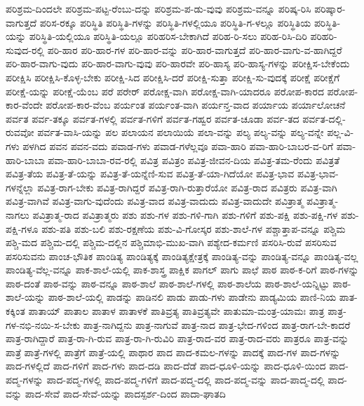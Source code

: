 {ಪರಿಶ್ರಮ-ದಿಂದಲೇ
ಪರಿಶ್ರಮ-ಪಟ್ಟ-ರೆಂಬು-ದನ್ನು
ಪರಿಶ್ರಮ-ಪ-ಡು-ವುವು
ಪರಿಶ್ರಮ-ವನ್ನೂ
ಪರಿಷ್ಕ-ರಿಸಿ
ಪರಿಷ್ಕಾರ-ವಾಗುತ್ತದೆ
ಪರಿಸ-ರಕ್ಕೂ
ಪರಿಸ್ಥಿತಿ
ಪರಿಸ್ಥಿತಿ-ಗಳನ್ನು
ಪರಿಸ್ಥಿತಿ-ಗಳಲ್ಲಿಯೂ
ಪರಿಸ್ಥಿತಿ-ಗ-ಳಲ್ಲೂ
ಪರಿಸ್ಥಿತಿಯ
ಪರಿಸ್ಥಿತಿ-ಯನ್ನು
ಪರಿಸ್ಥಿತಿ-ಯಲ್ಲಿಯೂ
ಪರಿಸ್ಥಿತಿ-ಯಲ್ಲೂ
ಪರಿಹರಿಸ-ಬೇಕಾಗಿದೆ
ಪರಿಹ-ರಿ-ಸಲು
ಪರಿಹ-ರಿಸಿ-ದಿರಿ
ಪರಿಹರಿ-ಸುವುದ-ರಲ್ಲಿ
ಪರಿ-ಹಾರ
ಪರಿ-ಹಾರ-ಗಳ
ಪರಿ-ಹಾರ-ವನ್ನು
ಪರಿ-ಹಾರ-ವಾಗುತ್ತದೆ
ಪರಿ-ಹಾರ-ವಾಗು-ವ-ಹಾಗಿದ್ದರೆ
ಪರಿ-ಹಾರ-ವಾಗು-ವುದು
ಪರಿ-ಹಾರ-ವಾಗು-ವುವು
ಪರಿ-ಹಾರವೇ
ಪರಿ-ಹಾಸ್ಯ
ಪರಿ-ಹಾಸ್ಯ-ಗಳನ್ನು
ಪರೀಕ್ಷಿಸ-ಬೇಕೆಂದು
ಪರೀಕ್ಷಿಸಿ
ಪರೀಕ್ಷಿಸಿ-ಕೊಳ್ಳ-ಬೇಕು
ಪರೀಕ್ಷಿ-ಸಿದ
ಪರೀಕ್ಷಿಸಿ-ದರೆ
ಪರೀಕ್ಷಿ-ಸುತ್ತಾ
ಪರೀಕ್ಷಿ-ಸು-ವುದಕ್ಕೆ
ಪರೀಕ್ಷೆ
ಪರೀಕ್ಷೆಗೆ
ಪರೀಕ್ಷೆ-ಯನ್ನು
ಪರೀಕ್ಷೆ-ಯೆಂಬ
ಪರೆ
ಪರೇರ್
ಪರೋಕ್ಷ-ವಾಗಿ
ಪರೋಕ್ಷ-ವಾಗಿ-ಯಾದರೂ
ಪರೋಪ-ಕಾರದ
ಪರೋಪ-ಕಾರ-ವೆಂದೇ
ಪರೋಪ-ಕಾರ-ವೆಂಬ
ಪರ್ಯಂತ
ಪರ್ಯಂತ-ವಾಗಿ
ಪರ್ಯನ್ತ-ವಾದ
ಪರ್ಯಾಯ
ಪರ್ಯಾಲೋಚನೆ
ಪರ್ವತ
ಪರ್ವ-ತಕ್ಕೂ
ಪರ್ವತ-ಗಳಲ್ಲಿ
ಪರ್ವತ-ಗಳಿಗೆ
ಪರ್ವತ-ಗಹ್ವರ
ಪರ್ವತ-ಚೂಡಾ
ಪರ್ವ-ತದ
ಪರ್ವತ-ದಲ್ಲಿ-ರುವವೋ
ಪರ್ವತ-ವಾಸಿ-ಯನ್ನು
ಪಲ
ಪಲಾಯನ
ಪಲಾಯಿಯೆ
ಪಲಾ-ವನ್ನು
ಪಲ್ಯ
ಪಲ್ಯ-ವನ್ನು
ಪಲ್ಯ-ವನ್ನೇ
ಪಲ್ಲ-ವಿ-ಗಳು
ಪಳಗಿದ
ಪವನ
ಪವನ-ವದು
ಪವಾಡ-ಗಳು
ಪವಾಡ-ಗಳೆಲ್ಲವೂ
ಪವಾ-ಹಾರಿ
ಪವಾ-ಹಾರಿ-ಬಾಬರ-ವ-ರಿಗೆ
ಪವಾ-ಹಾರಿ-ಬಾಬಾ
ಪವಾ-ಹಾರಿ-ಬಾಬಾ-ರವ-ರಲ್ಲಿ
ಪವಿತ್ರ
ಪವಿತ್ರಂ
ಪವಿತ್ರ-ಜೀವನ-ದಿಯ
ಪವಿತ್ರ-ತಮ-ರೆಂದು
ಪವಿತ್ರತೆ
ಪವಿತ್ರ-ತೆಯ
ಪವಿತ್ರ-ತೆ-ಯನ್ನು
ಪವಿತ್ರ-ತೆ-ಯನ್ನೆಣಿ-ಸುವ
ಪವಿತ್ರ-ತೆ-ಯಾ-ಗಿದೆಯೋ
ಪವಿತ್ರ-ಭಾವ
ಪವಿತ್ರ-ಭಾವ-ಗಳನ್ನೆಲ್ಲಾ
ಪವಿತ್ರ-ರಾಗ-ಬೇಕು
ಪವಿತ್ರ-ರಾಗಿದ್ದರೆ
ಪವಿತ್ರ-ರಾಗಿ-ರುತ್ತಾರೆಯೋ
ಪವಿತ್ರ-ರಾದ
ಪವಿತ್ರರು
ಪವಿತ್ರ-ವಾಗಿ
ಪವಿತ್ರ-ವಾಗಿವೆ
ಪವಿತ್ರ-ವಾಗು-ವುದೆಂದು
ಪವಿತ್ರ-ವಾದ
ಪವಿತ್ರ-ವಾದುದು
ಪವಿತ್ರ-ವಾದುದೇ
ಪವಿತ್ರಾತ್ಮ
ಪವಿತ್ರಾತ್ಮ-ನಾಗಲು
ಪವಿತ್ರಾತ್ಮ-ರಾದ
ಪವಿತ್ರಾತ್ಮರು
ಪಶು
ಪಶು-ಗಳ
ಪಶು-ಗಳಿ-ಗಾಗಿ
ಪಶು-ಗಳಿಗೆ
ಪಶು-ಪಕ್ಷಿ
ಪಶು-ಪಕ್ಷಿ-ಗಳ
ಪಶು-ಪಕ್ಷಿ-ಗಳೂ
ಪಶು-ಪತಿ
ಪಶು-ಬಲಿ
ಪಶು-ರಕ್ಷಣೆಯ
ಪಶು-ವಿ-ಗೋಸ್ಕರ
ಪಶು-ಶಾಲೆ-ಗಳ
ಪಶ್ಚಾತ್ತಾಪ-ವನ್ನೂ
ಪಶ್ಚಿಮ
ಪಶ್ಚಿ-ಮದ
ಪಶ್ಚಿಮ-ದಲ್ಲಿ
ಪಶ್ಚಿಮ-ದಲ್ಲಿನ
ಪಶ್ಚಿಮಾಭಿ-ಮುಖ-ವಾಗಿ
ಪಶ್ಯೇದ-ಕರ್ಮಣಿ
ಪಸರಿಸಿ-ರುವೆ
ಪಸರಿಸುವ
ಪಸರಿಸುವನು
ಪಾಂಚ-ಭೌತಿಕ
ಪಾಂಡಿತ್ಯ
ಪಾಂಡಿತ್ಯಕ್ಕೆ
ಪಾಂಡಿತ್ಯಕ್ಷೇತ್ರಕ್ಕೆ
ಪಾಂಡಿತ್ಯ-ವನ್ನು
ಪಾಂಡಿತ್ಯ-ವನ್ನೂ
ಪಾಂಡಿತ್ಯ-ವಲ್ಲ
ಪಾಂಡಿತ್ಯ-ವೆಲ್ಲ-ವನ್ನೂ
ಪಾಕ-ಶಾಲೆ-ಯಲ್ಲಿ
ಪಾಕ-ಶಾಸ್ತ್ರ
ಪಾಕ್ಷಿಕ
ಪಾಗಲ್
ಪಾಗು
ಪಾಛೆ
ಪಾಠ
ಪಾಠ-ಕ-ರಿಗೆ
ಪಾಠ-ಗಳನ್ನು
ಪಾಠ-ದಂತೆ
ಪಾಠ-ವನ್ನು
ಪಾಠ-ವನ್ನೂ
ಪಾಠ-ಶಾಲೆ
ಪಾಠ-ಶಾಲೆ-ಗಳಲ್ಲಿ
ಪಾಠ-ಶಾಲೆಯ
ಪಾಠ-ಶಾಲೆ-ಯನ್ನಿಟ್ಟು
ಪಾಠ-ಶಾಲೆ-ಯನ್ನು
ಪಾಠ-ಶಾಲೆ-ಯಲ್ಲಿ
ಪಾಡನ್ನು
ಪಾಡಿನಲಿ
ಪಾಡು
ಪಾಡು-ಗಳು
ಪಾಡೇನು
ಪಾಡ್ಯಮಿಯ
ಪಾಣಿ-ನಿಯ
ಪಾತ-ಕಕ್ಕಿಂತ
ಪಾತಾಯ್
ಪಾತಾಲ
ಪಾತಾಳ
ಪಾತಾಳಕೆ
ಪಾತಿವ್ರತ್ಯ
ಪಾತಿವ್ರತ್ಯವೇ
ಪಾತುಮಾ-ಮಂತ್ರ-ಯಾಮಃ
ಪಾತ್ರ
ಪಾತ್ರ-ಗಳ-ನಭಿ-ನಯಿ-ಸ-ಬೇಕು
ಪಾತ್ರ-ನಾಗಿದ್ದನು
ಪಾತ್ರ-ನಾಗುವೆ
ಪಾತ್ರ-ನಾದ
ಪಾತ್ರ-ಭೇದ-ಗಳಿಂದ
ಪಾತ್ರ-ರಾಗ-ಬೇ-ಕಾದರೆ
ಪಾತ್ರ-ರಾಗಿದ್ದಾರೆ
ಪಾತ್ರ-ರಾ-ಗಿ-ರುವ
ಪಾತ್ರ-ರಾ-ಗಿ-ರುವಿರಿ
ಪಾತ್ರ-ರಾದ-ವರ
ಪಾತ್ರ-ರಾದ-ವರು
ಪಾತ್ರರೂ
ಪಾತ್ರ-ವನ್ನು
ಪಾತ್ರೆ
ಪಾತ್ರೆ-ಗಳಲ್ಲಿ
ಪಾತ್ರೆಗೆ
ಪಾತ್ರೆ-ಯಲ್ಲಿ
ಪಾಥಾರ
ಪಾದ
ಪಾದ-ಕಮಲ-ಗಳನ್ನು
ಪಾದಕ್ಕೆ
ಪಾದ-ಗಳ
ಪಾದ-ಗಳನ್ನು
ಪಾದ-ಗಳಲ್ಲಿದೆ
ಪಾದ-ಗಳಿಗೆ
ಪಾದ-ಗಳು
ಪಾದ-ದಡಿ
ಪಾದ-ದೆಡೆ
ಪಾದ-ಧೂಳಿ-ಯನ್ನು
ಪಾದ-ಧೂಳಿ-ಯಿಂದ
ಪಾದ-ಪದ್ಮ-ಗಳನ್ನು
ಪಾದ-ಪದ್ಮ-ಗಳಲ್ಲಿ
ಪಾದ-ಪದ್ಮ-ಗಳಿಗೆ
ಪಾದ-ಪದ್ಮ-ದಲ್ಲಿ
ಪಾದ-ಪದ್ಮ-ವನ್ನು
ಪಾದ-ಪಾದ್ಮ-ದಲ್ಲಿ
ಪಾದ-ವನ್ನು
ಪಾದ-ಸೇವೆ
ಪಾದ-ಸೇವೆ-ಯನ್ನು
ಪಾದಸ್ಪರ್ಶ-ದಿಂದ
ಪಾದಾ-ಘಾತದಿ
}
